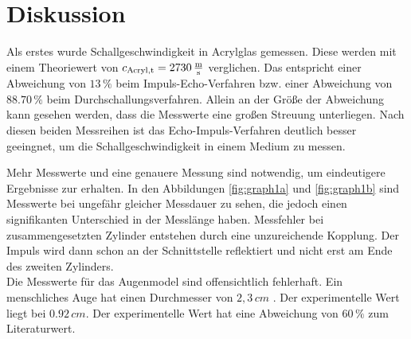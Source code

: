 \section{Diskussion}
\label{sec:Diskussion}
Als erstes wurde Schallgeschwindigkeit in Acrylglas gemessen.
Diese werden mit einem Theoriewert von
$c_{\text{Acryl},\text{t}} = 2730 \,\unit{\frac{\meter}{\second}} $ verglichen.
Das entspricht einer Abweichung von $13 \, \%$ beim Impuls-Echo-Verfahren bzw. einer Abweichung von $88.70 \, \%$ beim Durchschallungsverfahren. 
Allein an der Größe der Abweichung kann gesehen werden, dass die Messwerte eine großen Streuung unterliegen. Nach diesen beiden Messreihen ist das Echo-Impuls-Verfahren deutlich besser geeingnet, um die Schallgeschwindigkeit in einem Medium zu messen.

Mehr Messwerte und eine genauere Messung sind notwendig, um eindeutigere Ergebnisse zur erhalten.
In den Abbildungen \autoref{fig:graph1a} und \autoref{fig:graph1b} sind Messwerte bei ungefähr gleicher Messdauer zu sehen, die jedoch einen signifikanten Unterschied in der Messlänge haben.
Messfehler bei zusammengesetzten Zylinder entstehen durch eine unzureichende Kopplung. Der Impuls wird dann schon an der Schnittstelle reflektiert und nicht erst am Ende des zweiten Zylinders. \\

Die Messwerte für das Augenmodel sind offensichtlich fehlerhaft. Ein menschliches Auge hat einen Durchmesser von $ 2,3 \, \unit{cm} $ \cite{ap07}. Der experimentelle Wert liegt bei $ 0.92 \, \unit{cm}$.
Der experimentelle Wert hat eine Abweichung von $ 60 \, \% $ zum Literaturwert.